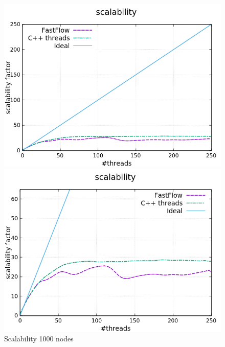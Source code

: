 \begin{figure}[H]
	\centering
	\begin{minipage}[t]{0.50\linewidth}
		\includegraphics[width=\linewidth]{benchmark/curves/scalability_standard_1000_20000.png}
		\vspace{0.2em}
	\end{minipage}%
	\begin{minipage}[t]{0.50\linewidth}
		\includegraphics[width=\linewidth]{benchmark/curves/scalability_zoom_1000_20000.png}
	\end{minipage}
	\caption{Scalability 1000 nodes}\label{fig:scalability2000}
\end{figure}

